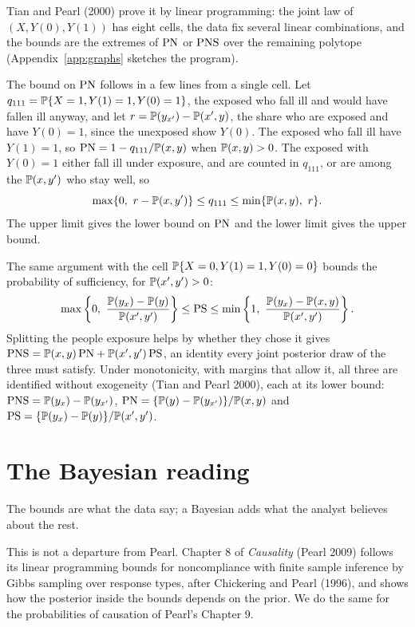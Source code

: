 Tian and Pearl (2000) prove it by linear programming: the joint law of $(X, Y(0), Y(1))$ has eight cells, the data fix several linear combinations, and the bounds are the extremes of $\mathrm{PN}$ or $\mathrm{PNS}$ over the remaining polytope (Appendix~\ref{app:graphs} sketches the program).

The bound on $\mathrm{PN}$ follows in a few lines from a single cell. Let $q_{111} = \mathbb{P}\{X = 1, Y(1) = 1, Y(0) = 1\}$, the exposed who fall ill and would have fallen ill anyway, and let $r = \mathbb{P}(y_{x'}) - \mathbb{P}(x', y)$, the share who are exposed and have $Y(0) = 1$, since the unexposed show $Y(0)$. The exposed who fall ill have $Y(1) = 1$, so $\mathrm{PN} = 1 - q_{111}/\mathbb{P}(x, y)$ when $\mathbb{P}(x, y) > 0$. The exposed with $Y(0) = 1$ either fall ill under exposure, and are counted in $q_{111}$, or are among the $\mathbb{P}(x, y')$ who stay well, so
\[
\max\{0,\ r - \mathbb{P}(x, y')\} \leq q_{111} \leq \min\{\mathbb{P}(x, y),\ r\}.
\]
The upper limit gives the lower bound on $\mathrm{PN}$ and the lower limit gives the upper bound.

The same argument with the cell $\mathbb{P}\{X = 0, Y(1) = 1, Y(0) = 0\}$ bounds the probability of sufficiency, for $\mathbb{P}(x', y') > 0$:
\[
\max\left\{0,\ \frac{\Prob(y_x) - \Prob(y)}{\Prob(x', y')}\right\} \leq \PS \leq \min\left\{1,\ \frac{\Prob(y_x) - \Prob(x, y)}{\Prob(x', y')}\right\}.
\]
Splitting the people exposure helps by whether they chose it gives $\mathrm{PNS} = \mathbb{P}(x, y)\,\mathrm{PN} + \mathbb{P}(x', y')\,\mathrm{PS}$, an identity every joint posterior draw of the three must satisfy. Under monotonicity, with margins that allow it, all three are identified without exogeneity (Tian and Pearl 2000), each at its lower bound: $\mathrm{PNS} = \mathbb{P}(y_x) - \mathbb{P}(y_{x'})$, $\mathrm{PN} = \{\mathbb{P}(y) - \mathbb{P}(y_{x'})\}/\mathbb{P}(x, y)$ and $\mathrm{PS} = \{\mathbb{P}(y_x) - \mathbb{P}(y)\}/\mathbb{P}(x', y')$.



\section{The Bayesian reading}

The bounds are what the data say; a Bayesian adds what the analyst believes about the rest.

This is not a departure from Pearl. Chapter 8 of \emph{Causality} (Pearl 2009) follows its linear programming bounds for noncompliance with finite sample inference by Gibbs sampling over response types, after Chickering and Pearl (1996), and shows how the posterior inside the bounds depends on the prior. We do the same for the probabilities of causation of Pearl's Chapter 9.

